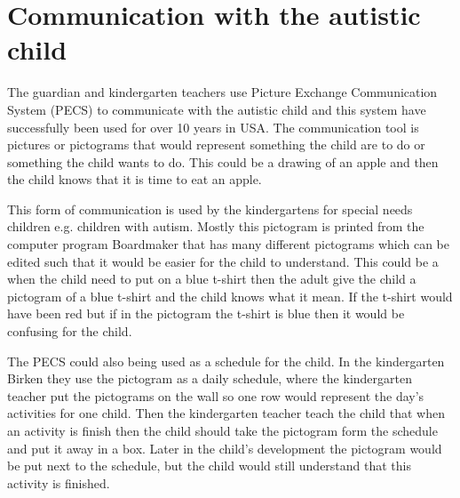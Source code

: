 \section{Communication with the autistic child}
The guardian and kindergarten teachers use Picture Exchange Communication System (PECS) to communicate with the autistic child and this system have successfully been used for over 10 years in USA\cite{centerAutism}. The communication tool is pictures or pictograms that would represent something the child are to do or something the child wants to do. This could be a drawing of an apple and then the child knows that it is time to eat an apple. 

This form of communication is used by the kindergartens for special needs children e.g. children with autism. Mostly this pictogram is printed from the computer program Boardmaker that has many different pictograms which can be edited such that it would be easier for the child to understand. This could be a when the child need to put on a blue t-shirt then the adult give the child a pictogram of a blue t-shirt and the child knows what it mean. If the t-shirt would have been red but if in the pictogram the t-shirt is blue then it would be confusing for the child. 

The PECS could also being used as a schedule for the child. In the kindergarten Birken they use the pictogram as a daily schedule, where the kindergarten teacher put the pictograms on the wall so one row would represent the day's activities for one child. Then the kindergarten teacher teach the child that when an activity is finish then the child should take the pictogram form the schedule and put it away in a box. Later in the child's development the pictogram would be put next to the schedule, but the child would still understand that this activity is finished. 